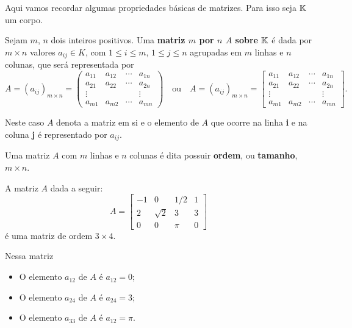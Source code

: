 Aqui vamos recordar algumas propriedades b\'asicas de matrizes. Para isso seja $\mathbb{K}$ um corpo.

Sejam $m$, $n$ dois inteiros positivos. Uma \textbf{matriz $m$ por $n$ $A$ sobre $\mathbb{K}$} \'e dada por $m \times n$ valores $a_{ij} \in K$, com $1 \le i \le m$, $1 \le j \le n$ agrupadas em $m$ linhas e $n$ colunas, que ser\'a representada por
\[
	A = (a_{ij})_{m\times n} = \begin{pmatrix}
		a_{11} & a_{12} & \cdots & a_{1n}\\
		a_{21} & a_{22} & \cdots & a_{2n}\\
		\vdots & & & \vdots\\
		a_{m1} & a_{m2} & \cdots & a_{mn}
	\end{pmatrix} \quad\mbox{ou}\quad
	A = (a_{ij})_{m\times n} = \begin{bmatrix}
		a_{11} & a_{12} & \cdots & a_{1n}\\
		a_{21} & a_{22} & \cdots & a_{2n}\\
		\vdots & & & \vdots\\
		a_{m1} & a_{m2} & \cdots & a_{mn}
	\end{bmatrix}.
\]

Neste caso $A$ denota a matriz em si e o elemento de $A$ que ocorre na linha \textbf{i} e na coluna \textbf{j} é representado por $a_{ij}$.

Uma matriz $A$ com $m$ linhas e $n$ colunas é dita possuir \textbf{ordem}, ou \textbf{tamanho}, $m \times n$.

\begin{exemplo}
	A matriz $A$ dada a seguir:
	\[
		A = \begin{bmatrix}
			-1 & 0 & 1/2 & 1\\
			2 & \sqrt{2} & 3 & 3\\
			0 & 0 & \pi & 0
		\end{bmatrix}
	\]
	é uma matriz de ordem $3 \times 4$.

	Nessa matriz
	\begin{itemize}
		\item O elemento $a_{12}$ de $A$ é $a_{12} = 0$;

		\item O elemento $a_{24}$ de $A$ é $a_{24} = 3$;
		
		\item O elemento $a_{33}$ de $A$ é $a_{12} = \pi$.
	\end{itemize}
\end{exemplo}

